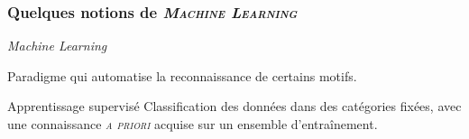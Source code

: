 \documentclass{beamer}
\begin{document}
\begin{frame}
\frametitle{Quelques notions de\textsc{ \it Machine Learning }}

\begin{block}{\begin{flushcenter} \it Machine Learning \end{flushcenter}}
Paradigme qui automatise la reconnaissance de certains motifs.
\end{block}




\pause

\begin{block}{Apprentissage supervisé}
Classification des données dans des catégories \alert{fixées}, avec une connaissance\textsc{ \it a priori} acquise sur un \alert{ensemble d'entraînement}.
\end{block}


\end{frame}
\end{document}
